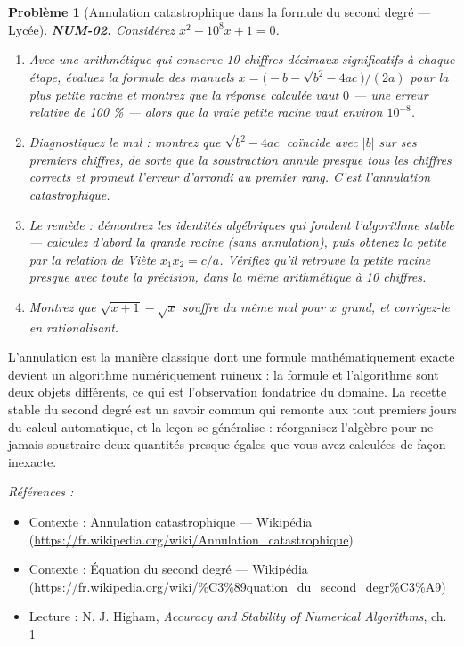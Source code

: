 \documentclass[11pt]{article}
\newtheorem{problem}{Problème}
\newenvironment{refs}{\par\small\noindent\emph{Références :}\begin{itemize}\setlength\itemsep{0pt}}{\end{itemize}\normalsize}
\begin{document}
\bigskip

\begin{problem}[{Annulation catastrophique dans la formule du second degré --- Lycée}]
\textbf{NUM-02.} Considérez $x^2 - 10^8 x + 1 = 0$.
\begin{enumerate}
\item[(a)] Avec une
arithmétique qui conserve 10 chiffres décimaux significatifs à chaque étape, évaluez
la formule des manuels $x = \big(-b - \sqrt{b^2 - 4ac}\big)/(2a)$ pour la plus petite
racine et montrez que la réponse calculée vaut $0$ --- une erreur relative de 100 \% ---
alors que la vraie petite racine vaut environ $10^{-8}$.
\item[(b)] Diagnostiquez le mal : montrez que
$\sqrt{b^2 - 4ac}$ coïncide avec $|b|$ sur ses premiers chiffres, de sorte que la
soustraction annule presque tous les chiffres corrects et promeut l'erreur d'arrondi
au premier rang. C'est l'\textit{annulation catastrophique}.
\item[(c)] Le remède : démontrez les identités algébriques
qui fondent l'algorithme stable --- calculez d'abord la grande racine (sans annulation),
puis obtenez la petite par la relation de Viète $x_1 x_2 = c/a$. Vérifiez qu'il
retrouve la petite racine presque avec toute la précision, dans la même arithmétique
à 10 chiffres.
\item[(d)] Montrez que
$\sqrt{x+1} - \sqrt{x}$ souffre du même mal pour $x$ grand, et corrigez-le en
rationalisant.
\end{enumerate}

\end{problem}

\noindent L'annulation est la manière classique dont une formule
mathématiquement exacte devient un algorithme numériquement ruineux : la formule et
l'algorithme sont deux objets différents, ce qui est l'observation fondatrice du
domaine. La recette stable du second degré est un savoir commun qui remonte aux
tout premiers jours du calcul automatique, et la leçon se généralise : réorganisez
l'algèbre pour ne jamais soustraire deux quantités presque égales que vous avez
calculées de façon inexacte.

\begin{refs}
\item Contexte : Annulation catastrophique --- Wikipédia (\url{https://fr.wikipedia.org/wiki/Annulation_catastrophique})
\item Contexte : Équation du second degré --- Wikipédia (\url{https://fr.wikipedia.org/wiki/%C3%89quation_du_second_degr%C3%A9})
\item Lecture : N. J. Higham, \textit{Accuracy and Stability of Numerical Algorithms}, ch. 1
\end{refs}
\end{document}
